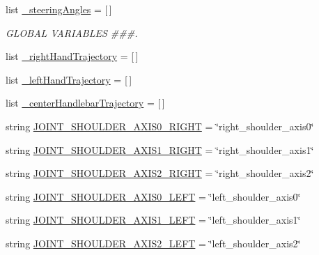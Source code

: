 \begin{DoxyCompactItemize}
\item 
list \mbox{\hyperlink{namespacemultiple__steering__trajectories_a177c18b8b616e43751c2cec2782ca78e}{\+\_\+steering\+Angles}} = \mbox{[}$\,$\mbox{]}
\begin{DoxyCompactList}\small\item\em G\+L\+O\+B\+AL V\+A\+R\+I\+A\+B\+L\+ES \#\#\#. \end{DoxyCompactList}\item 
list \mbox{\hyperlink{namespacemultiple__steering__trajectories_a468e447731250f640eb0097c16f3954c}{\+\_\+right\+Hand\+Trajectory}} = \mbox{[}$\,$\mbox{]}
\item 
list \mbox{\hyperlink{namespacemultiple__steering__trajectories_a3a019a174632fa4af163f19d832cc304}{\+\_\+left\+Hand\+Trajectory}} = \mbox{[}$\,$\mbox{]}
\item 
list \mbox{\hyperlink{namespacemultiple__steering__trajectories_a85160a21f657ecc1a75c86229829247b}{\+\_\+center\+Handlebar\+Trajectory}} = \mbox{[}$\,$\mbox{]}
\item 
string \mbox{\hyperlink{namespacemultiple__steering__trajectories_a97aab1340adaa1fab833a0b290c42090}{J\+O\+I\+N\+T\+\_\+\+S\+H\+O\+U\+L\+D\+E\+R\+\_\+\+A\+X\+I\+S0\+\_\+\+R\+I\+G\+HT}} = \char`\"{}right\+\_\+shoulder\+\_\+axis0\char`\"{}
\item 
string \mbox{\hyperlink{namespacemultiple__steering__trajectories_a139c785a3ea896c469a6abb6b9e8f4a6}{J\+O\+I\+N\+T\+\_\+\+S\+H\+O\+U\+L\+D\+E\+R\+\_\+\+A\+X\+I\+S1\+\_\+\+R\+I\+G\+HT}} = \char`\"{}right\+\_\+shoulder\+\_\+axis1\char`\"{}
\item 
string \mbox{\hyperlink{namespacemultiple__steering__trajectories_ab574ed22670ca70879a53422b682f85c}{J\+O\+I\+N\+T\+\_\+\+S\+H\+O\+U\+L\+D\+E\+R\+\_\+\+A\+X\+I\+S2\+\_\+\+R\+I\+G\+HT}} = \char`\"{}right\+\_\+shoulder\+\_\+axis2\char`\"{}
\item 
string \mbox{\hyperlink{namespacemultiple__steering__trajectories_ad697f01905c383e015df6947fc5c59c5}{J\+O\+I\+N\+T\+\_\+\+S\+H\+O\+U\+L\+D\+E\+R\+\_\+\+A\+X\+I\+S0\+\_\+\+L\+E\+FT}} = \char`\"{}left\+\_\+shoulder\+\_\+axis0\char`\"{}
\item 
string \mbox{\hyperlink{namespacemultiple__steering__trajectories_a88bb58c527405a2dfba2106e597620c7}{J\+O\+I\+N\+T\+\_\+\+S\+H\+O\+U\+L\+D\+E\+R\+\_\+\+A\+X\+I\+S1\+\_\+\+L\+E\+FT}} = \char`\"{}left\+\_\+shoulder\+\_\+axis1\char`\"{}
\item 
string \mbox{\hyperlink{namespacemultiple__steering__trajectories_a6155a3dd8f49d41252aefb5e8cdf7482}{J\+O\+I\+N\+T\+\_\+\+S\+H\+O\+U\+L\+D\+E\+R\+\_\+\+A\+X\+I\+S2\+\_\+\+L\+E\+FT}} = \char`\"{}left\+\_\+shoulder\+\_\+axis2\char`\"{}

\end{DoxyCompactItemize}

